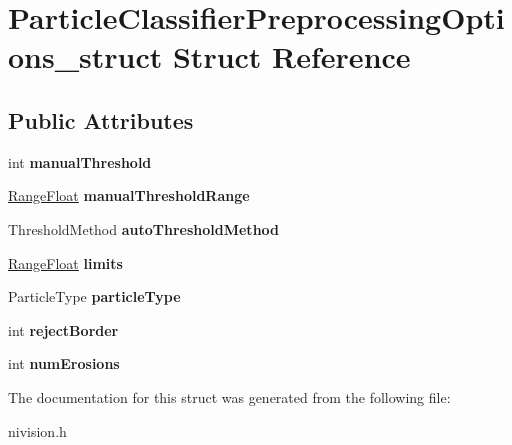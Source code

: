 \hypertarget{structParticleClassifierPreprocessingOptions__struct}{
\section{ParticleClassifierPreprocessingOptions\_\-struct Struct Reference}
\label{structParticleClassifierPreprocessingOptions__struct}
}
\subsection*{Public Attributes}
\begin{DoxyCompactItemize}
\item 
\hypertarget{structParticleClassifierPreprocessingOptions__struct_aa8246a6e547e5313509168b4081ba6f1}{
int {\bfseries manualThreshold}}
\label{structParticleClassifierPreprocessingOptions__struct_aa8246a6e547e5313509168b4081ba6f1}

\item 
\hypertarget{structParticleClassifierPreprocessingOptions__struct_a078af5da5236dff6d3e38e0a1852cb54}{
\hyperlink{structRangeFloat__struct}{RangeFloat} {\bfseries manualThresholdRange}}
\label{structParticleClassifierPreprocessingOptions__struct_a078af5da5236dff6d3e38e0a1852cb54}

\item 
\hypertarget{structParticleClassifierPreprocessingOptions__struct_a7865ab1314bd942c7c2301b3dd670ff1}{
ThresholdMethod {\bfseries autoThresholdMethod}}
\label{structParticleClassifierPreprocessingOptions__struct_a7865ab1314bd942c7c2301b3dd670ff1}

\item 
\hypertarget{structParticleClassifierPreprocessingOptions__struct_af2182f5e11d685a7528361d9700af617}{
\hyperlink{structRangeFloat__struct}{RangeFloat} {\bfseries limits}}
\label{structParticleClassifierPreprocessingOptions__struct_af2182f5e11d685a7528361d9700af617}

\item 
\hypertarget{structParticleClassifierPreprocessingOptions__struct_aefef6539a0531b91f54fa728aad7cd47}{
ParticleType {\bfseries particleType}}
\label{structParticleClassifierPreprocessingOptions__struct_aefef6539a0531b91f54fa728aad7cd47}

\item 
\hypertarget{structParticleClassifierPreprocessingOptions__struct_a44250fa8e9699756a4258c3b81703bdd}{
int {\bfseries rejectBorder}}
\label{structParticleClassifierPreprocessingOptions__struct_a44250fa8e9699756a4258c3b81703bdd}

\item 
\hypertarget{structParticleClassifierPreprocessingOptions__struct_ab42c35852cf91289b9ad6c3adb76863b}{
int {\bfseries numErosions}}
\label{structParticleClassifierPreprocessingOptions__struct_ab42c35852cf91289b9ad6c3adb76863b}

\end{DoxyCompactItemize}


The documentation for this struct was generated from the following file:\begin{DoxyCompactItemize}
\item 
nivision.h\end{DoxyCompactItemize}
